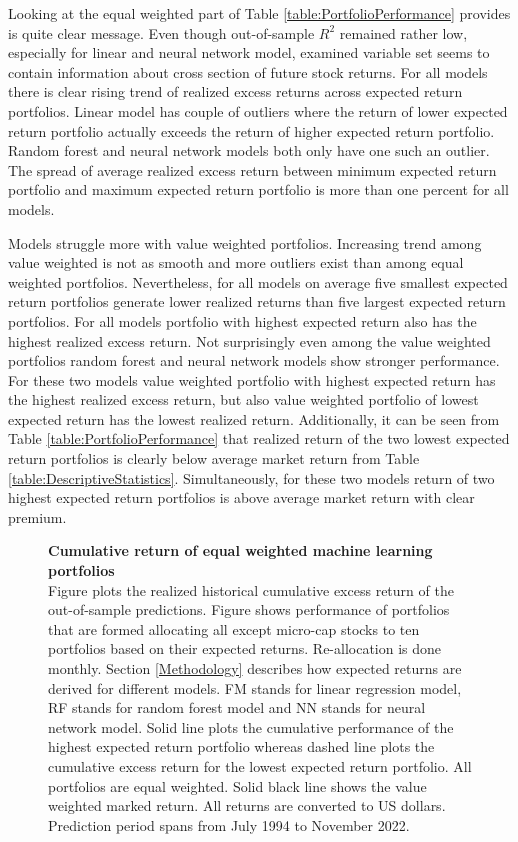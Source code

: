 \documentclass[12pt]{article}
\begin{document}
Looking at the equal weighted part of Table \ref{table:PortfolioPerformance} provides is quite clear message. Even though out-of-sample $R^2$ remained rather low, especially for linear and neural network model, examined variable set seems to contain information about cross section of future stock returns. For all models there is clear rising trend of realized excess returns across expected return portfolios. Linear model has couple of outliers where the return of lower expected return portfolio actually exceeds the return of higher expected return portfolio. Random forest and neural network models both only have one such an outlier. The spread of average realized excess return between minimum expected return portfolio and maximum expected return portfolio is more than one percent for all models.  \par

Models struggle more with value weighted portfolios. Increasing trend among value weighted is not as smooth and more outliers exist than among equal weighted portfolios. Nevertheless, for all models on average five smallest expected return portfolios generate lower realized returns than five largest expected return portfolios. For all models portfolio with highest expected return also has the highest realized excess return. Not surprisingly even among the value weighted portfolios random forest and neural network models show stronger performance. For these two models value weighted portfolio with highest expected return has the highest realized excess return, but also value weighted portfolio of lowest expected return has the lowest realized return. Additionally, it can be seen from Table \ref{table:PortfolioPerformance} that realized return of the two lowest expected return portfolios is clearly below average market return from Table \ref{table:DescriptiveStatistics}. Simultaneously, for these two models return of two highest expected return portfolios is above average market return with clear premium. \par

\begin{figure}[ht]
\centering
\caption[Cumulative return of equal weighted machine learning portfolios]{\textbf{Cumulative return of equal weighted machine learning portfolios}\\ Figure plots the realized historical cumulative excess return of the out-of-sample predictions. Figure shows performance of portfolios that are formed allocating all except micro-cap stocks to ten portfolios based on their expected returns. Re-allocation is done monthly. Section \ref{Methodology} describes how expected returns are derived for different models. FM stands for linear regression model, RF stands for random forest model and NN stands for neural network model. Solid line plots the cumulative performance of the highest expected return portfolio whereas dashed line plots the cumulative excess return for the lowest expected return portfolio. All portfolios are equal weighted. Solid black line shows the value weighted marked return. All returns are converted to US dollars. Prediction period spans from July 1994 to November 2022.}

\label{plot:cumul_ew_portf_return}
\end{figure}
\end{document}
